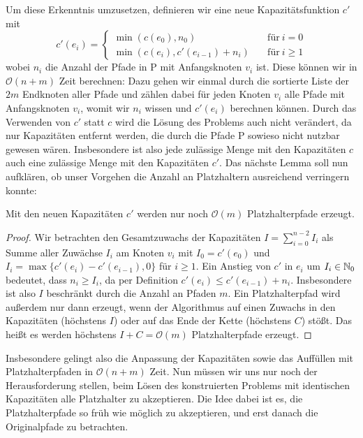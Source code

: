 Um diese Erkenntnis umzusetzen, definieren wir eine neue Kapazitätsfunktion $c'$ mit
\[
	c'(e_i) =
	\begin{cases}
		\min(c(e_0), n_0) &\quad\text{für}\ i=0\\
		\min(c(e_i), c'(e_{i-1}) + n_i) &\quad\text{für}\ i \geq 1
	\end{cases}
\]
wobei $n_i$ die Anzahl der Pfade in P mit Anfangsknoten $v_i$ ist.
Diese können wir in $\mathcal O(n+m)$ Zeit berechnen: Dazu gehen wir einmal durch die sortierte Liste der $2m$ Endknoten
aller Pfade und zählen dabei für jeden Knoten $v_i$ alle Pfade mit Anfangsknoten $v_i$, womit wir $n_i$ wissen und
$c'(e_i)$ berechnen können.
Durch das Verwenden von $c'$ statt $c$ wird die Lösung des Problems auch nicht verändert, da nur Kapazitäten entfernt
werden, die durch die Pfade P sowieso nicht nutzbar gewesen wären.
Insbesondere ist also jede zulässige Menge mit den Kapazitäten $c$ auch eine zulässige Menge mit den Kapazitäten $c'$.
Das nächste Lemma soll nun aufklären, ob unser Vorgehen die Anzahl an Platzhaltern ausreichend verringern konnte:

\begin{lemma}
    Mit den neuen Kapazitäten $c'$ werden nur noch $\mathcal O(m)$ Platzhalterpfade erzeugt.
\end{lemma}
\begin{proof}
    Wir betrachten den Gesamtzuwachs der Kapazitäten $I = \sum_{i = 0}^{n-2} I_i$ als Summe aller Zuwächse $I_i$ am
    Knoten $v_i$ mit $I_0 = c'(e_0)$ und $I_i = \max\{c'(e_i) - c'(e_{i-1}), 0\}$ für $i \geq 1$.
    Ein Anstieg von $c'$ in $e_i$ um $I_i \in \mathbb N_0$ bedeutet, dass $n_i \geq I_i$, da per Definition
    $c'(e_i) \leq c'(e_{i-1}) + n_i$.
    Insbesondere ist also $I$ beschränkt durch die Anzahl an Pfaden $m$.
    Ein Platzhalterpfad wird außerdem nur dann erzeugt, wenn der Algorithmus auf einen Zuwachs in den Kapazitäten (höchstens $I$)
    oder auf das Ende der Kette (höchstens $C$) stößt.
    Das heißt es werden höchstens $I + C = \mathcal O(m)$ Platzhalterpfade erzeugt.
\end{proof}

Insbesondere gelingt also die Anpassung der Kapazitäten sowie das Auffüllen mit Platzhalterpfaden in $\mathcal O(n+m)$ Zeit.
Nun müssen wir uns nur noch der Herausforderung stellen, beim Lösen des konstruierten Problems mit identischen Kapazitäten alle
Platzhalter zu akzeptieren.
Die Idee dabei ist es, die Platzhalterpfade so früh wie möglich zu akzeptieren, und erst danach die Originalpfade zu
betrachten.


